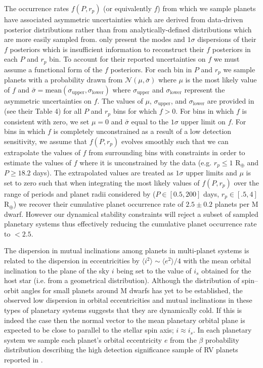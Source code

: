 The occurrence rates $f(P,r_p)$ (or equivalently $f$) from which we sample planets have
associated asymmetric uncertainties which are derived from data-driven posterior distributions
rather than from analytically-defined distributions which are more easily sampled from. \cite{dressing15a}
only present the modes and $1\sigma$ dispersions of their $f$ posteriors which is insufficient information
to reconstruct their $f$ posteriors in each $P$ and $r_p$ bin. To account for their reported uncertainties on
$f$ we must assume a functional form of the $f$ posteriors.
For each bin in $P$ and $r_p$ we sample planets with a probability drawn
from $\mathcal{N}(\mu, \bar{\sigma})$ where $\mu$ is the most likely value
of $f$ and $\bar{\sigma} = \text{mean}(\sigma_{\text{upper}},\sigma_{\text{lower}})$ where
$\sigma_{\text{upper}}$ and $\sigma_{\text{lower}}$ represent the asymmetric uncertainties on $f$.
The values of $\mu$, $\sigma_{\text{upper}}$, and $\sigma_{\text{lower}}$ are provided in \cite{dressing15a}
(see their Table 4) for all $P$ and $r_p$ bins for which $f>0$. For bins in which $f$ is consistent with zero,
we set $\mu=0$ and $\bar{\sigma}$ equal to the $1\sigma$ upper limit on $f$. For bins in
which $f$ is completely unconstrained as a result of a low detection sensitivity, we assume that $f(P,r_p)$ 
evolves smoothly such that we can extrapolate the values of $f$ from surrounding
bins with constraints in order to estimate the values of $f$ where it is unconstrained by the data
(e.g. $r_p \leq 1$ R$_{\oplus}$ and $P \geq 18.2$ days).
The extrapolated values are treated as $1\sigma$ upper limits and $\mu$ is set to zero such that when
integrating the most likely values of
$f(P,r_p)$ over the range of periods and planet radii considered by \citealt{dressing15a} ($P \in [0.5,200]$ days,
$r_p \in [.5,4]$ R$_{\oplus}$) we recover their cumulative
planet occurrence rate of $2.5 \pm 0.2$ planets per M dwarf. However our dynamical stability constraints will
reject a subset of sampled planetary systems thus effectively reducing the cumulative planet occurrence rate to
$<2.5$.

The dispersion in mutual inclinations among planets in multi-planet 
systems is related to the dispersion in eccentricities by $\langle i^2 \rangle \sim \langle e^2 \rangle /4$ 
\citep{stewart00, quillen07} with the mean orbital inclination 
to the plane of the sky $i$ being set to the value of $i_s$ obtained for the host star (i.e. from a geometrical
distribution). Although the distribution of spin--orbit angles for small planets around
M dwarfs has yet to be established, the observed low dispersion in orbital eccentricities \citep{vaneylen15}
and mutual inclinations \citep{figueira12, fabrycky14} in these types of planetary systems suggests that
they are dynamically cold. If this is indeed the case then the normal vector
to the mean planetary orbital plane is expected to be close to parallel to the stellar spin axis; $i \approx i_s$.
In each planetary system we sample each planet's orbital eccentricity $e$ from the $\beta$ probability
distribution describing the high detection significance sample of RV planets reported in \cite{cloutier15}
\citep[see also ][]{kipping13}. 

